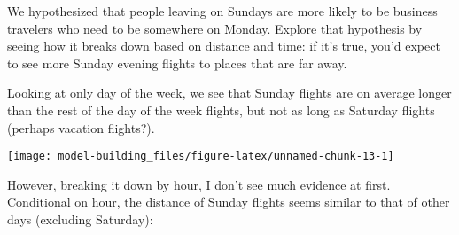 \documentclass[]{book}
\newenvironment{Shaded}{\begin{snugshade}}{\end{snugshade}}
\newcommand{\DataTypeTok}[1]{\textcolor[rgb]{0.13,0.29,0.53}{#1}}
\newcommand{\KeywordTok}[1]{\textcolor[rgb]{0.13,0.29,0.53}{\textbf{#1}}}
\newcommand{\NormalTok}[1]{#1}
\newcommand{\OperatorTok}[1]{\textcolor[rgb]{0.81,0.36,0.00}{\textbf{#1}}}
\newcommand{\OtherTok}[1]{\textcolor[rgb]{0.56,0.35,0.01}{#1}}
\newcommand{\StringTok}[1]{\textcolor[rgb]{0.31,0.60,0.02}{#1}}
\theoremstyle{plain}
\theoremstyle{remark}
\theoremstyle{definition}
\theoremstyle{definition}
\theoremstyle{definition}
\theoremstyle{remark}
\begin{document}
We hypothesized that people leaving on Sundays are more likely to be
business travelers who need to be somewhere on Monday. Explore that
hypothesis by seeing how it breaks down based on distance and time: if
it's true, you'd expect to see more Sunday evening flights to places
that are far away.

Looking at only day of the week, we see that Sunday flights are on
average longer than the rest of the day of the week flights, but not as
long as Saturday flights (perhaps vacation flights?).

\begin{Shaded}
\end{Shaded}

\begin{center}\texttt{[image: model-building\_files/figure-latex/unnamed-chunk-13-1]} \end{center}

However, breaking it down by hour, I don't see much evidence at first.
Conditional on hour, the distance of Sunday flights seems similar to
that of other days (excluding Saturday):

\begin{Shaded}
\end{Shaded}
\end{document}
